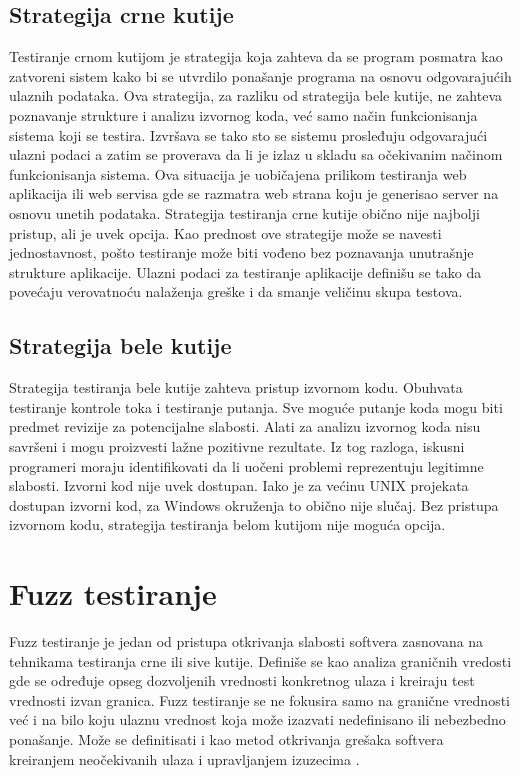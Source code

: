 \documentclass[a4paper]{article}
\begin{document}
{\subsection{Strategija crne kutije}
\label{subsec:crna_kutija}
Testiranje crnom kutijom je strategija koja
zahteva da se program posmatra kao zatvoreni sistem kako bi se utvrdilo ponašanje programa na osnovu odgovarajućih ulaznih podataka. Ova strategija, za
razliku od strategija bele kutije, ne zahteva poznavanje strukture i analizu
izvornog koda, već samo način funkcionisanja sistema koji se
testira. Izvršava se tako sto se sistemu prosleđuju odgovarajući ulazni podaci a zatim se proverava da li je izlaz u skladu sa očekivanim načinom funkcionisanja
sistema. Ova situacija je uobičajena prilikom testiranja web aplikacija ili web servisa gde se razmatra web strana koju je generisao server na osnovu unetih podataka.
Strategija testiranja crne kutije obično nije najbolji pristup, ali je uvek opcija. Kao prednost ove strategije može se navesti jednostavnost, pošto testiranje može biti vođeno bez poznavanja unutrašnje strukture aplikacije.
Ulazni podaci za testiranje aplikacije definišu se tako da povećaju verovatnoću nalaženja
greške i da smanje veličinu skupa testova.

\subsection{Strategija bele kutije}
\label{subsec:bela_kutija}
Strategija testiranja bele kutije zahteva pristup izvornom kodu. Obuhvata testiranje kontrole toka i testiranje putanja. Sve moguće putanje koda mogu biti predmet revizije za potencijalne slabosti.
Alati za analizu izvornog koda nisu savršeni i mogu proizvesti lažne pozitivne rezultate. Iz tog razloga, iskusni programeri moraju identifikovati da li uočeni problemi reprezentuju legitimne slabosti.
Izvorni kod nije uvek dostupan. Iako je za većinu UNIX projekata dostupan izvorni kod, za Windows okruženja to obično nije slučaj. Bez pristupa izvornom kodu, strategija testiranja belom kutijom nije moguća opcija.

\section{Fuzz testiranje}
\label{sec:fuzz_testiranje}
Fuzz testiranje je jedan od pristupa otkrivanja slabosti softvera zasnovana na tehnikama testiranja crne ili sive kutije. Definiše se kao analiza graničnih vredosti gde se određuje opseg dozvoljenih vrednosti konkretnog ulaza i kreiraju test vrednosti izvan granica. Fuzz testiranje se ne fokusira samo na granične vrednosti već i na bilo koju ulaznu vrednost koja može izazvati nedefinisano ili nebezbedno ponašanje. Može se definitisati i kao metod otkrivanja grešaka softvera kreiranjem neočekivanih ulaza i upravljanjem izuzecima \cite{fuzzing} \cite{fuzzingBruteForce}.


}
\end{document}

